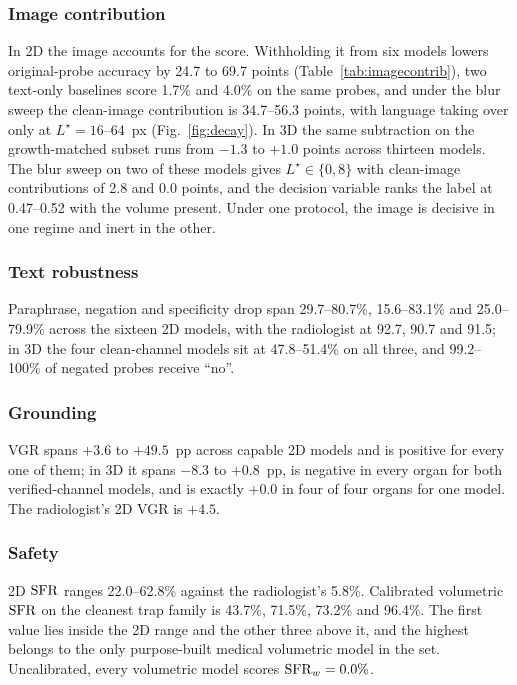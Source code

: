 \subsubsection{Image contribution} In 2D the image accounts for the
score. Withholding it from six models lowers original-probe accuracy by 24.7
to 69.7 points (Table~\ref{tab:imagecontrib}), two text-only baselines score
1.7\% and 4.0\% on the same probes, and under the blur sweep the clean-image
contribution is 34.7--56.3 points, with language taking over only at
$L^{\star}=16$--64~px (Fig.~\ref{fig:decay}). In 3D the same subtraction on
the growth-matched subset runs from $-1.3$ to $+1.0$ points across thirteen
models. The blur sweep on two of these models gives $L^{\star}\in\{0,8\}$
with clean-image contributions of 2.8 and 0.0 points, and the decision
variable ranks the label at 0.47--0.52 with the volume present. Under one
protocol, the image is decisive in one regime and inert in the other.

\subsubsection{Text robustness} Paraphrase, negation and specificity drop
span 29.7--80.7\%, 15.6--83.1\% and 25.0--79.9\% across the sixteen 2D
models, with the radiologist at 92.7, 90.7 and 91.5; in 3D the four
clean-channel models sit at 47.8--51.4\% on all three, and 99.2--100\% of
negated probes receive ``no''.

\subsubsection{Grounding} VGR spans $+3.6$ to $+49.5$~pp across capable 2D
models and is positive for every one of them; in 3D it spans $-8.3$ to
$+0.8$~pp, is negative in every organ for both verified-channel models, and
is exactly $+0.0$ in four of four organs for one model. The radiologist's 2D
VGR is $+4.5$.

\subsubsection{Safety} 2D $\mathrm{SFR}$ ranges 22.0--62.8\% against the
radiologist's 5.8\%. Calibrated volumetric $\mathrm{SFR}$ on the cleanest trap family
is 43.7\%, 71.5\%, 73.2\% and 96.4\%. The first value lies inside the 2D
range and the other three above it, and the highest belongs to the only
purpose-built medical volumetric model in the set. Uncalibrated, every volumetric model scores
$\mathrm{SFR}_{w}=0.0\%$.

